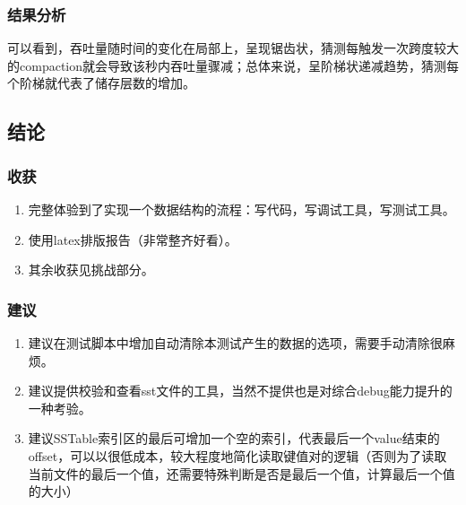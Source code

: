 \documentclass{ctexart}
\begin{document}
\subsubsection{结果分析}
可以看到，吞吐量随时间的变化在局部上，呈现锯齿状，猜测每触发一次跨度较大的compaction就会导致该秒内吞吐量骤减；总体来说，呈阶梯状递减趋势，猜测每个阶梯就代表了储存层数的增加。


\subsection{结论}

\subsubsection{收获}
\begin{enumerate}
  \item 完整体验到了实现一个数据结构的流程：写代码，写调试工具，写测试工具。
  \item 使用latex排版报告（非常整齐好看）。
  \item 其余收获见挑战部分。
\end{enumerate}

\subsubsection{建议}
\begin{enumerate}
  \item 建议在测试脚本中增加自动清除本测试产生的数据的选项，需要手动清除很麻烦。
  \item 建议提供校验和查看sst文件的工具，当然不提供也是对综合debug能力提升的一种考验。
  \item 建议SSTable索引区的最后可增加一个空的索引，代表最后一个value结束的offset，可以以很低成本，较大程度地简化读取键值对的逻辑（否则为了读取当前文件的最后一个值，还需要特殊判断是否是最后一个值，计算最后一个值的大小）
\end{enumerate}
\end{document}
